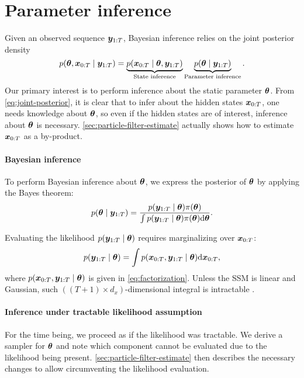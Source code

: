 \section{Parameter inference} \label{sec:parameter-inference}
Given an observed sequence $\bm{y}_{1:T}$, Bayesian inference relies on the joint posterior density
\begin{equation}\label{eq:joint-posterior}
p(\bm{\theta}, \bm{x}_{0:T} \mid \bm{y}_{1:T}) = \underbrace{p(\bm{x}_{0:T} \mid \bm{\theta}, \bm{y}_{1:T})}_{\text{State inference}} \underbrace{p(\bm{\theta} \mid \bm{y}_{1:T})}_{\text{Parameter inference}}.
\end{equation}
Our primary interest is to perform inference about the static parameter $\bm{\theta}$. From \eqref{eq:joint-posterior}, it is clear that to infer about the hidden states $\bm{x}_{0:T}$, one needs knowledge about $\bm{\theta}$, so even if the hidden states are of interest, inference about $\bm{\theta}$ is necessary. \autoref{sec:particle-filter-estimate} actually shows how to estimate $\bm{x}_{0:T}$ as a by-product.


\paragraph{Bayesian inference}

To perform Bayesian inference about $\bm{\theta}$, we express the posterior of $\bm{\theta}$ by applying the Bayes theorem:
\begin{equation*}
p(\bm{\theta} \mid \bm{y}_{1:T}) = \frac{p(\bm{y}_{1:T} \mid \bm{\theta}) \pi(\bm{\theta})}{\int p(\bm{y}_{1:T} \mid \bm{\theta}) \pi(\bm{\theta}) \mathrm{d}{\bm{\theta}}}.
\end{equation*}

Evaluating the likelihood $p(\bm{y}_{1:T} \mid \bm{\theta})$ requires marginalizing over $\bm{x}_{0:T}$:
\begin{equation*}
p(\bm{y}_{1:T} \mid \bm{\theta}) = \int p(\bm{x}_{0:T}, \bm{y}_{1:T} \mid \bm{\theta}) \mathrm{d}{\bm{x}_{0:T}},
\end{equation*}
where $p(\bm{x}_{0:T}, \bm{y}_{1:T} \mid \bm{\theta})$ is given in \eqref{eq:factorization}. Unless the SSM is linear and Gaussian, such $((T+1) \times d_x)$-dimensional integral is intractable \citep{andrieu}.


\paragraph{Inference under tractable likelihood assumption}

For the time being, we proceed as if the likelihood was tractable. We derive a sampler for $\bm{\theta}$ and note which component cannot be evaluated due to the likelihood being present. \autoref{sec:particle-filter-estimate} then describes the necessary changes to allow circumventing the likelihood evaluation.

